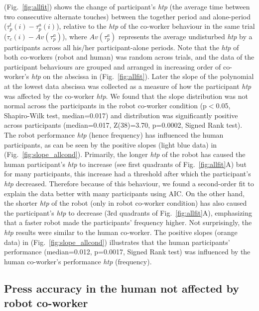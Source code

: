 (Fig.~\ref{fig:allfit}) shows the change of participant's {\it htp} (the average time between two consecutive alternate touches) between the together period and alone-period ($\tau_p^t(i)-\tau_p^a(i)$), relative to the {\it htp} of the co-worker behaviour in the same trial ($\tau_c (i)-Av(\tau_p^a)$), where $Av(\tau_p^a)$ represents the average undisturbed {\it htp} by a participants across all his/her participant-alone periods. Note that the {\it htp} of both co-workers (robot and human) was random across trials, and the data of the participant behaviours are grouped and arranged in increasing order of co-worker's {\it htp} on the abscissa in (Fig.~\ref{fig:allfit}). Later the slope of the polynomial at the lowest data abscissa was collected as a measure of how the participant {\it htp} was affected by the co-worker {\it htp}. We found that the slope distribution was not normal across the participants in the robot co-worker condition (p$<$0.05, Shapiro-Wilk test, median=0.017) and distribution was significantly positive across participants (median=0.017, Z(38)=3.70, p=0.0002, Signed Rank test). The robot performance {\it htp} (hence frequency) has influenced the human participants, as can be seen by the positive slopes (light blue data) in (Fig.~\ref{fig:slope_allcond}). Primarily, the longer \textit{htp} of the robot has caused the human participant's {\it htp} to increase (see first quadrants of Fig.~\ref{fig:allfit}A) but for many participants, this increase had a threshold after which the participant's {\it htp} decreased. Therefore because of this behaviour, we found a second-order fit to explain the data better with many participants using AIC. On the other hand, the shorter \textit{htp} of the robot (only in robot co-worker condition) has also caused the participant's {\it htp} to decrease (3rd quadrants of Fig.~\ref{fig:allfit}A), emphasizing that a faster robot made the participants' frequency higher. Not surprisingly, the {\it htp} results were similar to the human co-worker. The positive slopes (orange data) in (Fig.~\ref{fig:slope_allcond}) illustrates that the human participants' performance (median=0.012, p=0.0017, Signed Rank test) was influenced by the human co-worker's performance {\it htp} (frequency).


\subsection{Press accuracy in the human not affected by robot co-worker}
 
